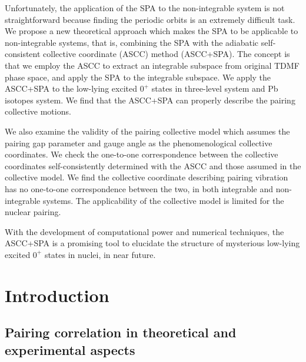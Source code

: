 \documentclass[11pt]{book} %
\begin{document}
Unfortunately, the application of the SPA to the non-integrable system is not straightforward because finding the periodic orbits is an extremely difficult task. We propose a new theoretical approach which makes the SPA to be applicable to non-integrable systems, that is, combining the SPA with the adiabatic self-consistent collective coordinate (ASCC) method (ASCC+SPA). The concept is that we employ the ASCC to extract an integrable subspace from original TDMF phase space, and apply the SPA to the integrable subspace. 
We apply the ASCC+SPA to the low-lying excited $0^+$ states in three-level system and Pb isotopes system. We find that the ASCC+SPA can properly describe the pairing collective motions. 

We also examine the validity of the pairing collective model which assumes the pairing gap parameter and gauge angle as the phenomenological collective coordinates. We check the one-to-one correspondence between the collective coordinates self-consistently determined with the ASCC and those assumed in the collective model. We find the collective coordinate describing pairing vibration has no one-to-one correspondence between the two, in both integrable and non-integrable systems. The applicability of the collective model is limited for the nuclear pairing.

With the development of computational power and numerical techniques,
the ASCC+SPA is a promising tool to elucidate the structure of mysterious low-lying excited $0^+$ states in nuclei, in near future.

\thispagestyle{empty}

\setcounter{page}{-1}
\tableofcontents

\chapter{Introduction}

\section{Pairing correlation in theoretical and experimental aspects}
\end{document}
